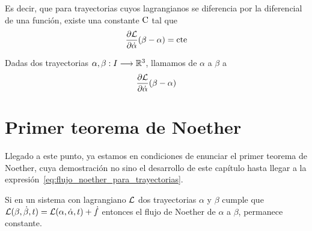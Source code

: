 Es decir, que para trayectorias cuyos lagrangianos se diferencia por la diferencial de una función, existe una constante $\text{\rmfamily\upshape C}$ tal que
\begin{equation}
	\label{eq:flujo_noether_para_trayectorias}
	\frac{\partial \mathcal{L}}{\partial\dot{\alpha}}(\beta-\alpha) = \text{\rmfamily\upshape cte}
\end{equation}

\begin{definition}
	Dadas dos trayectorias $\alpha,\beta:I\longrightarrow \mathbb{R}^3$, llamamos  de $\alpha$ a $\beta$ a
	\begin{equation}
		\label{eq:flujo_noether}
		\frac{\partial \mathcal{L}}{\partial\dot{\alpha}}(\beta-\alpha)
	\end{equation}
\end{definition}

\section{Primer teorema de Noether}\label{sec:primer-teorema-de-noether}

Llegado a este punto, ya estamos en condiciones de enunciar el primer teorema de Noether, cuya demostración no sino el desarrollo de este capítulo hasta llegar a la expresión~\ref{eq:flujo_noether_para_trayectorias}.

\begin{theorem}
	\label{thm:noether}
	Si en un sistema con lagrangiano $\mathcal{L}$ dos trayectorias $\alpha$ y $\beta$ cumple que $\mathcal{L}(\beta, \dot{\beta}, t) = \mathcal{L}(\alpha, \dot{\alpha}, t)+\dot{f}$ entonces el flujo de Noether de $\alpha$ a $\beta$, permanece constante.
\end{theorem}